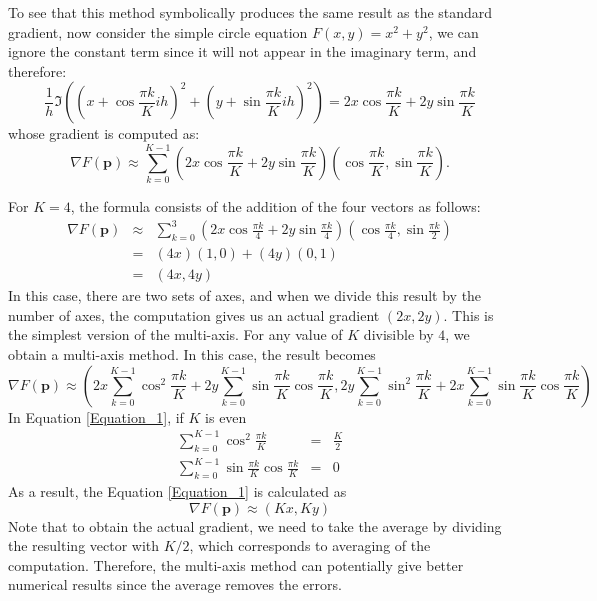 \documentclass{article}
\begin{document}
To see that this method symbolically produces the same result as the standard gradient, now consider the simple circle equation $F(x,y) = x^2+y^2$, we can ignore the constant term since it will not appear in the imaginary term, and therefore: 
\begin{equation} 
\frac{1}{h} \Im \left( \left(x + \cos \frac{ \pi k }{K}  i h \right)^2 + \left( y + \sin \frac{ \pi k}{K}  i h \right)^2 \right)  =
 2 x \cos \frac{ \pi k }{K}  + 2 y \sin \frac{ \pi k}{K} 
\end{equation}
whose gradient is computed as: 
\begin{equation} 
\nabla F(\mathbf{p})  \approx \sum_{k=0}^{K-1} \left( 2 x \cos \frac{\pi k }{K}  + 2 y \sin \frac{ \pi k}{K} \right)  \left( \cos \frac{ \pi k }{K}, \sin \frac{ \pi k }{K}  \right) .
\end{equation}

For $K=4$, the formula consists of the addition of the four vectors as follows: 
\begin{eqnarray} 
\nabla F(\mathbf{p}) &\approx& \sum_{k=0}^{3} \left( 2 x \cos \frac{\pi k }{4}  + 2 y \sin \frac{ \pi k}{4} \right)  \left( \cos \frac{ \pi k }{4}, \sin \frac{ \pi k }{2}  \right) \nonumber \\
&=&  \left( 4 x \right)  \left( 1, 0  \right)  +   \left( 4 y \right)  \left( 0, 1  \right) \nonumber \\
&=& (4x, 4y)
\end{eqnarray}
In this case, there are two sets of axes, and when we divide this result by the number of axes, the computation gives us an actual gradient $(2x, 2y)$. This is the simplest version of the multi-axis. For any value of $K$ divisible by $4$, we obtain a multi-axis method. In this case, the result becomes 
\begin{equation} 
\nabla F(\mathbf{p}) \approx \left( 2 x  \sum_{k=0}^{K-1}  \cos^2 \frac{\pi k }{K}  + 2 y \sum_{k=0}^{K-1} \sin \frac{ \pi k}{K} \cos \frac{ \pi k }{K} , 
2 y \sum_{k=0}^{K-1}   \sin^2 \frac{\pi k }{K}  +  2 x \sum_{k=0}^{K-1} \sin \frac{ \pi k}{K} \cos \frac{ \pi k }{K}\right)  \label{Equation_1}
\end{equation}
In Equation \ref{Equation_1}, if $K$ is even 
\begin{eqnarray} 
\sum_{k=0}^{K-1}  \cos^2 \frac{\pi k }{K}  &=& \frac{K}{2}  \label{Equation_2} \\
\sum_{k=0}^{K-1}  \sin \frac{ \pi k}{K} \cos \frac{ \pi k }{K} &=& 0  \label{Equation_3}
\end{eqnarray}
As a result, the Equation \ref{Equation_1} is calculated as 
\begin{equation} 
\nabla F(\mathbf{p}) \approx (Kx, Ky)  \label{Equation_4}
\end{equation}
Note that to obtain the actual gradient, we need to take the average by dividing the resulting vector with $K/2$, which corresponds to averaging of the computation. Therefore, the multi-axis method can potentially give better numerical results since the average removes the errors. 
\end{document}
